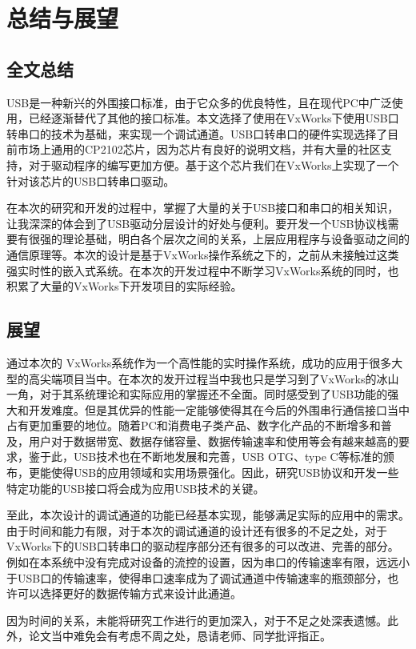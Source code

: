 \chapter{总结与展望}
\section{全文总结}
	USB是一种新兴的外围接口标准，由于它众多的优良特性，且在现代PC中广泛使用，已经逐渐替代了其他的接口标准。本文选择了使用在VxWorks下使用USB口转串口的技术为基础，来实现一个调试通道。USB口转串口的硬件实现选择了目前市场上通用的CP2102芯片，因为芯片有良好的说明文档，并有大量的社区支持，对于驱动程序的编写更加方便。基于这个芯片我们在VxWorks上实现了一个针对该芯片的USB口转串口驱动。
	
	在本次的研究和开发的过程中，掌握了大量的关于USB接口和串口的相关知识，让我深深的体会到了USB驱动分层设计的好处与便利。要开发一个USB协议栈需要有很强的理论基础，明白各个层次之间的关系，上层应用程序与设备驱动之间的通信原理等。本次的设计是基于VxWorks操作系统之下的，之前从未接触过这类强实时性的嵌入式系统。在本次的开发过程中不断学习VxWorks系统的同时，也积累了大量的VxWorks下开发项目的实际经验。


\section{展望}

	通过本次的 VxWorks系统作为一个高性能的实时操作系统，成功的应用于很多大型的高尖端项目当中。在本次的发开过程当中我也只是学习到了VxWorks的冰山一角，对于其系统理论和实际应用的掌握还不全面。同时感受到了USB功能的强大和开发难度。但是其优异的性能一定能够使得其在今后的外围串行通信接口当中占有更加重要的地位。随着PC和消费电子类产品、数字化产品的不断增多和普及，用户对于数据带宽、数据存储容量、数据传输速率和使用等会有越来越高的要求，鉴于此，USB技术也在不断地发展和完善，USB OTG、type C等标准的颁布，更能使得USB的应用领域和实用场景强化。因此，研究USB协议和开发一些特定功能的USB接口将会成为应用USB技术的关键。
	
	至此，本次设计的调试通道的功能已经基本实现，能够满足实际的应用中的需求。由于时间和能力有限，对于本次的调试通道的设计还有很多的不足之处，对于VxWorks下的USB口转串口的驱动程序部分还有很多的可以改进、完善的部分。例如在本系统中没有完成对设备的流控的设置，因为串口的传输速率有限，远远小于USB口的传输速率，使得串口速率成为了调试通道中传输速率的瓶颈部分，也许可以选择更好的数据传输方式来设计此通道。 
	
	因为时间的关系，未能将研究工作进行的更加深入，对于不足之处深表遗憾。此外，论文当中难免会有考虑不周之处，恳请老师、同学批评指正。
